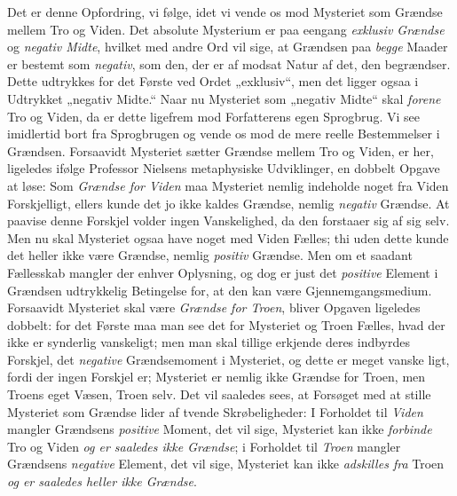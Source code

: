 \documentclass[12pt,a4paper]{book}
\newcommand{\opage}[1]{\marginnote{\footnotesize\textit{[#1]}}}
\begin{document}
Det er denne Opfordring, vi følge, idet vi vende
\opage{14}\setcounter{footnote}{0}%
os mod Mysteriet som Grændse mellem Tro og Viden. Det
absolute Mysterium er paa eengang \emph{exklusiv Grændse}
og \emph{negativ Midte}, hvilket med andre Ord vil sige, at
Grændsen paa \emph{begge} Maader er bestemt som \emph{negativ},
som den, der er af modsat Natur af det, den begrændser.
Dette udtrykkes for det Første ved Ordet „exklusiv“, men
det ligger ogsaa i Udtrykket „negativ Midte.“ Naar nu
Mysteriet som „negativ Midte“ skal \emph{forene} Tro og
Viden, da er dette ligefrem mod Forfatterens egen
Sprogbrug. Vi see imidlertid bort fra Sprogbrugen og
vende os mod de mere reelle Bestemmelser i Grændsen.
Forsaavidt Mysteriet sætter Grændse mellem Tro og
Viden, er her, ligeledes ifølge Professor Nielsens metaphysiske
Udviklinger, en dobbelt Opgave at løse: Som
\emph{Grændse for Viden} maa Mysteriet nemlig indeholde
noget fra Viden Forskjelligt, ellers kunde det jo ikke
kaldes Grændse, nemlig \emph{negativ} Grændse. At paavise
denne Forskjel volder ingen Vanskelighed, da den forstaaer
sig af sig selv. Men nu skal Mysteriet ogsaa
have noget med Viden Fælles; thi uden dette kunde det
heller ikke være Grændse, nemlig \emph{positiv} Grændse. Men
om et saadant Fællesskab mangler der enhver Oplysning,
og dog er just det \emph{positive} Element i Grændsen
udtrykkelig Betingelse for, at den kan være Gjennemgangsmedium.
Forsaavidt Mysteriet skal være \emph{Grændse
for Troen}, bliver Opgaven ligeledes dobbelt: for det
Første maa man see det for Mysteriet og Troen Fælles,
hvad der ikke er synderlig vanskeligt; men man skal tillige
erkjende deres indbyrdes Forskjel, det \emph{negative}
Grændsemoment i Mysteriet, og dette er meget vanske%
\opage{15}\setcounter{footnote}{0}%
ligt, fordi der ingen Forskjel er; Mysteriet er nemlig
ikke Grændse for Troen, men Troens eget Væsen, Troen
selv. Det vil saaledes sees, at Forsøget med at stille
Mysteriet som Grændse lider af tvende Skrøbeligheder:
I Forholdet til \emph{Viden} mangler Grændsens \emph{positive}
Moment, det vil sige, Mysteriet kan ikke \emph{forbinde} Tro
og Viden \emph{og er saaledes ikke Grændse}; i Forholdet
til \emph{Troen} mangler Grændsens \emph{negative} Element,
det vil sige, Mysteriet kan ikke \emph{adskilles fra} Troen
\emph{og er saaledes heller ikke Grændse}.
\end{document}

